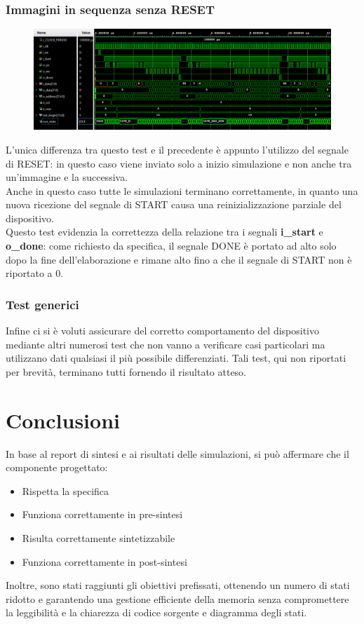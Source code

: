\documentclass[a4paper, 12pt]{article}
\begin{document}
\subsubsection{Immagini in sequenza senza RESET}
\begin{figure}[h]
    \centering
    \includegraphics[trim=0cm 1.25cm 0cm 0.25cm, width=1.0\textwidth]{simulazioni/GEN_NO_RESET.png}
    \label{fig:gen_no_reset}
\end{figure}
L'unica differenza tra questo test e il precedente è appunto l'utilizzo del segnale di  RESET: in questo caso viene inviato solo a inizio simulazione e non anche tra un'immagine e la successiva. \\
Anche in questo caso tutte le simulazioni terminano correttamente, in quanto una nuova ricezione del segnale di START causa una reinizializzazione parziale del dispositivo. \\
Questo test evidenzia la correttezza della relazione tra i segnali \textbf{i\_start }e \textbf{o\_done}: come richiesto da specifica, il segnale DONE è portato ad alto solo dopo la fine dell'elaborazione e rimane alto fino a che il segnale di START non è riportato a 0.

\subsubsection{Test generici}
Infine ci si è voluti assicurare del corretto comportamento del dispositivo mediante altri numerosi test che non vanno a verificare casi particolari ma utilizzano dati qualsiasi il più possibile differenziati. Tali test, qui non riportati per brevità, terminano tutti fornendo il risultato atteso.

\newpage
\section{Conclusioni}
In base al report di sintesi e ai risultati delle simulazioni, si può affermare che il componente progettato:
\begin{itemize}
    \item Rispetta la specifica
    \item Funziona correttamente in pre-sintesi
    \item Risulta correttamente sintetizzabile
    \item Funziona correttamente in post-sintesi
\end{itemize}
Inoltre, sono stati raggiunti gli obiettivi prefissati, ottenendo un numero di stati ridotto e garantendo una gestione efficiente della memoria senza compromettere la leggibilità e la chiarezza di codice sorgente e diagramma degli stati.
\end{document}
